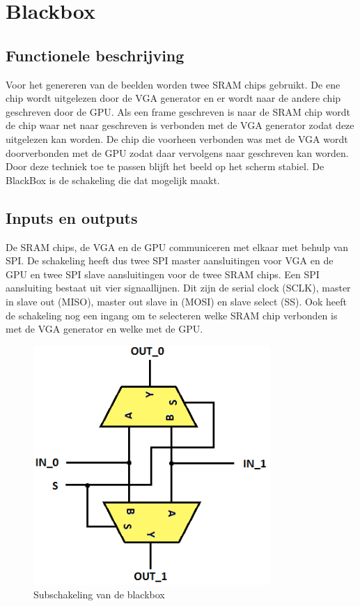 \documentclass[oneside,dutch]{tudelft-report}
\begin{document}
\newpage


\chapter{Blackbox}
\section{Functionele beschrijving}
Voor het genereren van de beelden worden twee SRAM chips gebruikt. De ene chip wordt uitgelezen door de VGA generator en er wordt naar de andere chip geschreven door de GPU. Als een frame geschreven is naar de SRAM chip wordt de chip waar net naar geschreven is verbonden met de VGA generator zodat deze uitgelezen kan worden. De chip die voorheen verbonden was met de VGA wordt doorverbonden met de GPU zodat daar vervolgens naar geschreven kan worden. Door deze techniek toe te passen blijft het beeld op het scherm stabiel. De BlackBox is de schakeling die dat mogelijk maakt.
\section{Inputs en outputs}
De SRAM chips, de VGA en de GPU communiceren met elkaar met behulp van SPI. De schakeling heeft dus twee SPI master aansluitingen voor VGA en de GPU en twee SPI slave aansluitingen voor de twee SRAM chips. Een SPI aansluiting bestaat uit vier signaallijnen. Dit zijn de serial clock (SCLK), master in slave out (MISO), master out slave in (MOSI) en slave select (SS). Ook heeft de schakeling nog een ingang om te selecteren welke SRAM chip verbonden is met de VGA generator en welke met de GPU.

\begin{figure}[H]
\center
\includegraphics[width=9cm]{./BlackBox_Circuit}
\caption{Subschakeling van de blackbox}
\label{sub-blackbox}
\end{figure}
\end{document}
